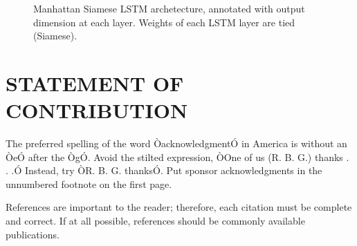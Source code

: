 \documentclass[letterpaper, 10 pt, conference]{ieeeconf}  %
\begin{document}
   \begin{figure}[thpb]
      \centering
      \caption{Manhattan Siamese LSTM archetecture, annotated with output dimension at each layer. Weights of each LSTM layer are tied (Siamese).}
      \label{figurelabel}
   \end{figure}



\section*{STATEMENT OF CONTRIBUTION}

The preferred spelling of the word ÒacknowledgmentÓ in America is without an ÒeÓ after the ÒgÓ. Avoid the stilted expression, ÒOne of us (R. B. G.) thanks . . .Ó  Instead, try ÒR. B. G. thanksÓ. Put sponsor acknowledgments in the unnumbered footnote on the first page.




References are important to the reader; therefore, each citation must be complete and correct. If at all possible, references should be commonly available publications.
\end{document}
